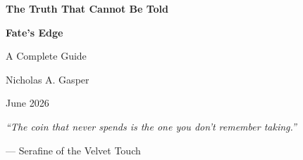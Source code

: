 \begin{titlepage}
\centering
\vspace*{1cm}

{\Huge\bfseries The Truth That Cannot Be Told\par}
\vspace{0.3cm}
{\Large\bfseries Fate's Edge\par}
\vspace{0.5cm}
{\large A Complete Guide\par}
\vspace{2cm}

{\large Nicholas A. Gasper\par}
\vspace{0.3cm}
{\large June 2026\par}

\vfill
{\large \textit{``The coin that never spends is the one you don't remember taking.''}\par}
\vspace{0.2cm}
{\large --- Serafine of the Velvet Touch\par}

\end{titlepage}
